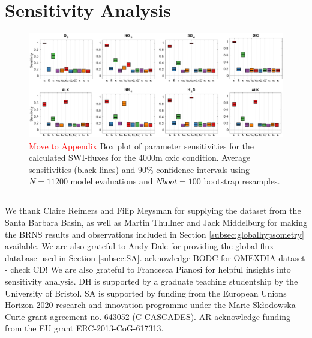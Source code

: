 \documentclass[gmd, manuscript]{copernicus}
\begin{document}
\section{Sensitivity Analysis} 


\begin{figure}[htbp]
\begin{center}
	\includegraphics[width=1.0\textwidth]{figures/SA/0_SIndex_4000m_ALL_combined.pdf}
	\caption{\textcolor{red}{Move to Appendix} Box plot of parameter sensitivities for the calculated SWI-fluxes for the 4000m oxic condition. 
	Average sensitivities (black lines) and 90\% confidence intervals using $N=11200$ model evaluations and $Nboot = 100$ bootstrap resamples.}
	\label{fig:SA_O2+NO3}
	\end{center}
\end{figure}


\subsection{}                               %




\begin{acknowledgements}
We thank Claire Reimers and Filip Meysman for supplying the dataset from the Santa Barbara Basin, as well as Martin Thullner and Jack Middelburg for making the BRNS results and observations 
included in Section \ref{subsec:globalhypsometry} available. We are also grateful to Andy Dale for providing the global flux database used in Section \ref{subsec:SA}.
acknowledge BODC for OMEXDIA dataset - check CD!  
We are also grateful to Francesca Pianosi for helpful insights into sensitivity analysis. 
DH is supported by a graduate teaching studentship by the University of Bristol. SA is supported by funding from
the European Unions Horizon 2020 research and innovation programme under the Marie Sk\l{}odowska-Curie grant agreement no.
643052 (C-CASCADES). AR acknowledge funding from the EU grant ERC-2013-CoG-617313.
\end{acknowledgements}
\end{document}
